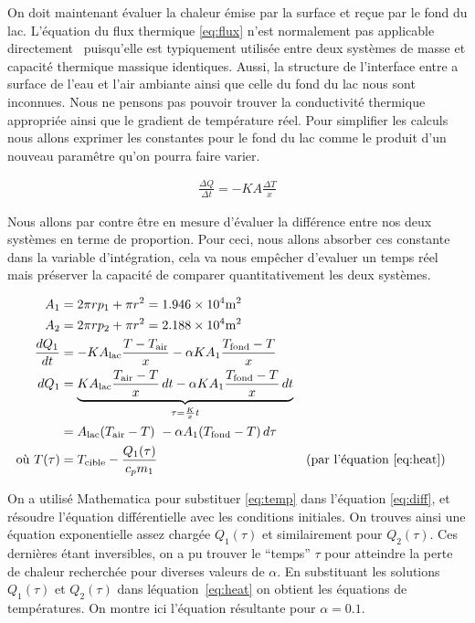 \documentclass[12pt]{article}
\numberwithin{figure}{section}
\begin{document}
On doit maintenant \'evaluer la chaleur \'emise par la surface et re\c cue par le fond du lac.
L'\'equation du flux thermique \eqref{eq:flux} n'est normalement pas applicable
directement~\cite{HeatFlow} puisqu'elle est typiquement utilis\'ee entre deux syst\`emes de masse et
capacit\'e thermique massique identiques. Aussi, la structure de l'interface entre a surface de
l'eau et l'air ambiante ainsi que celle du fond du lac nous sont inconnues. Nous ne pensons pas
pouvoir trouver la conductivit\'e thermique appropri\'ee ainsi que le gradient de temp\'erature
r\'eel. Pour simplifier les calculs nous allons exprimer les constantes pour le fond du lac comme le
produit d'un nouveau param\^etre qu'on pourra faire varier.

\begin{align}
    \frac{\Delta Q}{\Delta t} = -KA\frac{\Delta T}x \label{eq:flux}
\end{align}

Nous allons par contre \^etre en mesure d'\'evaluer la diff\'erence entre nos deux syst\`emes en
terme de proportion. Pour ceci, nous allons absorber ces constante dans la variable d'int\'egration,
cela va nous emp\^echer d'evaluer un temps r\'eel mais pr\'eserver la capacit\'e de comparer
quantitativement les deux syst\`emes.

\begin{align}
    A_1 &= 2\pi r p_1 + \pi r^2 = \num{1.946e4}\si{\square\meter}\notag\\
    A_2 &= 2\pi r p_2 + \pi r^2 = \num{2.188e4}\si{\square\meter}\notag\\
    \frac{dQ_1}{dt} &=
        -KA_\text{lac}\frac{T - T_\text{air}}x -\alpha KA_1\frac{T_\text{fond}-T}x\notag\\
    dQ_1 &=
        \underbrace{KA_\text{lac}\frac{T_\text{air}-T}x\,dt
        -\alpha KA_1\frac{T_\text{fond}-T}x\,dt}_{\tau = \frac Kxt}\notag\\
    &= A_\text{lac}(T_\text{air} - T)\ - \alpha A_1(T_\text{fond} - T)\,d\tau\label{eq:diff}\\
    \text{o\`u } T(\tau) &= T_\text{cible} - \frac{Q_1(\tau)}{c_pm_1} \label{eq:temp}&&\text{(par l'\'equation \ref{eq:heat})}
\end{align}

On a utilis\'e Mathematica pour substituer \eqref{eq:temp} dans l'\'equation \eqref{eq:diff}, et
r\'esoudre l'\'equation diff\'erentielle avec les conditions initiales. On trouves ainsi une
\'equation exponentielle assez charg\'ee $Q_1(\tau)$ et similairement pour $Q_2(\tau)$. Ces
derni\`eres \'etant inversibles, on a pu trouver le ``temps'' $\tau$ pour atteindre la perte de
chaleur recherch\'ee pour diverses valeurs de $\alpha$. En substituant les solutions $Q_1(\tau)$ et
$Q_2(\tau)$ dans l\'equation~\ref{eq:heat} on obtient les \'equations de temp\'eratures. On montre
ici l'\'equation r\'esultante pour $\alpha = 0.1$.
\end{document}
